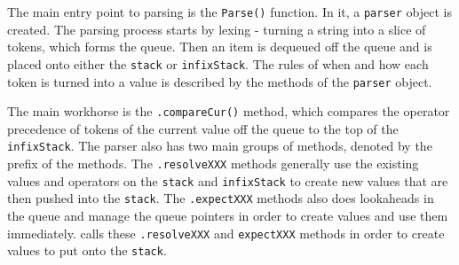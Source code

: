 \documentclass{article}
\begin{document}
The main entry point to parsing is the \texttt{Parse()} function. In it, a \texttt{parser} object is created. The parsing process starts by lexing -  turning a string into a slice of tokens, which forms the queue. Then an item is dequeued off the queue and is placed onto either the \texttt{stack} or \texttt{infixStack}. The rules of when and how each token is turned into a value is described by the methods of the \texttt{parser} object.

The main workhorse is the \texttt{.compareCur()} method, which compares the operator precedence of tokens of the current value off the queue to the top of the \texttt{infixStack}. The parser also has two main groups of methods, denoted by the prefix of the methods. The \texttt{.resolveXXX} methods generally use the existing values and operators on the \texttt{stack} and \texttt{infixStack} to create new values that are then pushed into the \texttt{stack}. The \texttt{.expectXXX} methods also does lookaheads in the queue and manage the queue pointers in order to create values and use them immediately.  calls these \texttt{.resolveXXX} and \texttt{expectXXX} methods in order to create values to put onto the \texttt{stack}.
\end{document}
